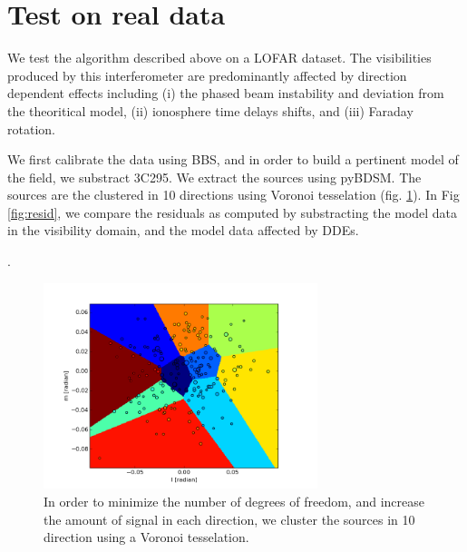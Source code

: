 \section{Test on real data}

We test the algorithm described above on a LOFAR dataset. The
visibilities produced by this interferometer are predominantly
affected by direction dependent effects including (i) the phased beam instability and deviation from the
theoritical model, (ii) ionosphere time delays shifts, and (iii)
Faraday rotation.

We first calibrate the data using BBS, and in order to build a
pertinent model of the field, we substract 3C295. We extract the
sources using pyBDSM. The sources are the clustered in 10 directions using Voronoi
tesselation (fig. \ref{fig:tessel}). In Fig \ref{fig:resid}, we compare the residuals as
computed by substracting the model data in the visibility domain, and
the model data affected by DDEs.



.
\begin{figure}[]
\begin{center}
\includegraphics[width=8cm]{tessel}
\caption{\label{fig:tessel} In order to minimize the number of degrees
of freedom, and increase the amount of signal in each direction, we cluster the sources in 10 direction using a Voronoi
tesselation.}
\end{center}
\end{figure}


